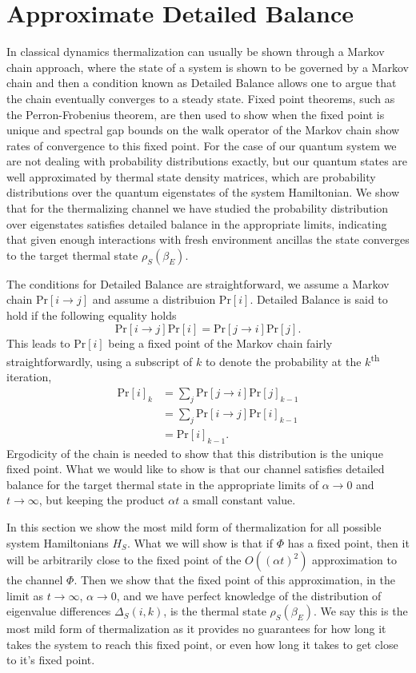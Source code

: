 \documentclass{article}
\newcommand{\prob}[1]{\text{Pr}\left[ #1 \right]}
\newcommand{\bigo}[1]{O\left( #1 \right)}
\newcommand{\ts}{\textsuperscript}
\begin{document}
\section{Approximate Detailed Balance}
In classical dynamics thermalization can usually be shown through a Markov chain approach, where the state of a system is shown to be governed by a Markov chain and then a condition known as Detailed Balance allows one to argue that the chain eventually converges to a steady state. Fixed point theorems, such as the Perron-Frobenius theorem, are then used to show when the fixed point is unique and spectral gap bounds on the walk operator of the Markov chain show rates of convergence to this fixed point. For the case of our quantum system we are not dealing with probability distributions exactly, but our quantum states are well approximated by thermal state density matrices, which are probability distributions over the quantum eigenstates of the system Hamiltonian. We show that for the thermalizing channel we have studied the probability distribution over eigenstates satisfies detailed balance in the appropriate limits, indicating that given enough interactions with fresh environment ancillas the state converges to the target thermal state $\rho_S(\beta_E)$.

The conditions for Detailed Balance are straightforward, we assume a Markov chain $\prob{i \to j }$ and assume a distribuion $\prob{i}$. Detailed Balance is said to hold if the following equality holds
\begin{equation}
    \prob{i \to j} \prob{i} = \prob{j \to i} \prob{j}.
\end{equation}
This leads to $\prob{i}$ being a fixed point of the Markov chain fairly straightforwardly, using a subscript of $k$ to denote the probability at the $k$\ts{th} iteration,
\begin{align}
    \prob{i}_k &= \sum_{j} \prob{j \to i} \prob{j}_{k - 1} \\
    &= \sum_j \prob{i \to j} \prob{i}_{k - 1} \\
    &= \prob{i}_{k - 1}.
\end{align}
Ergodicity of the chain is needed to show that this distribution is the unique fixed point. What we would like to show is that our channel satisfies detailed balance for the target thermal state in the appropriate limits of $\alpha \to 0$ and $t \to \infty$, but keeping the product $\alpha t$ a small constant value.


In this section we show the most mild form of thermalization for all possible system Hamiltonians $H_S$. What we will show is that if $\Phi$ has a fixed point, then it will be arbitrarily close to the fixed point of the $\bigo{(\alpha t)^2}$ approximation to the channel $\Phi$. Then we show that the fixed point of this approximation, in the limit as $t \to \infty$, $\alpha \to 0$, and we have perfect knowledge of the distribution of eigenvalue differences $\Delta_S(i,k)$, is the thermal state $\rho_S(\beta_E)$. We say this is the most mild form of thermalization as it provides no guarantees for how long it takes the system to reach this fixed point, or even how long it takes to get close to it's fixed point. 
\end{document}
